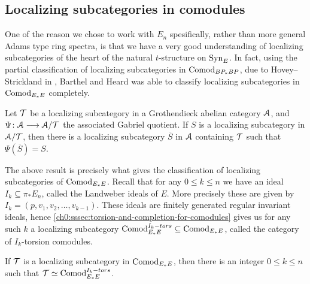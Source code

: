 






\subsection{Localizing subcategories in comodules}

One of the reason we chose to work with $E_n$ spesifically, rather than more general Adams type ring spectra, is that we have a very good understanding of localizing subcategories of the heart of the natural $t$-structure on $\mathrm{Syn}_{E}$. In fact, using the partial classification of localizing subcategories in $\mathrm{Comod}_{BP_*BP}$, due to Hovey--Strickland in \cite{hovey-strickland_2005a}, Barthel and Heard was able to classify localizing subcategories in $\mathrm{Comod}_{E_*E}$ completely. 

\begin{proposition}
    Let $\mathcal{T}$ be a localizing subcategory in a Grothendieck abelian category $\EuScript{A}$, and $\Psi\colon\EuScript{A}\longrightarrow \EuScript{A}/\mathcal{T}$ the associated Gabriel quotient. If $S$ is a localizing subcategory in $\EuScript{A}/\mathcal{T}$, then there is a localizing subcategory $\overline{S}$ in $\EuScript{A}$ containing $\mathcal{T}$ such that $\Psi(\overline{S})=S$. 
\end{proposition}

The above result is precisely what gives the classification of localizing subcategories of $\mathrm{Comod}_{E_*E}$. Recall that for any $0\leq k\leq n$ we have an ideal $I_k \subseteq \pi_* E_n$, called the Landweber ideals of $E$. More precisely these are given by $I_k = (p, v_1, v_2, \ldots, v_{k-1})$. These ideals are finitely generated regular invariant ideals, hence \cref{ch0:sssec:torsion-and-completion-for-comodules} gives us for any such $k$ a localizing subcategory $\mathrm{Comod}_{E_*E}^{I_k-tors}\subseteq \mathrm{Comod}_{E_*E}$, called the category of $I_k$-torsion comodules. 

\begin{theorem}
    \label{ch3:add:thm:classification-of-abelian-localizing}
    If $\mathcal{T}$ is a localizing subcategory in $\mathrm{Comod}_{E_*E}$, then there is an integer $0\leq k\leq n$ such that $\mathcal{T} \simeq \mathrm{Comod}_{E_*E}^{I_k-tors}$. 
\end{theorem}

